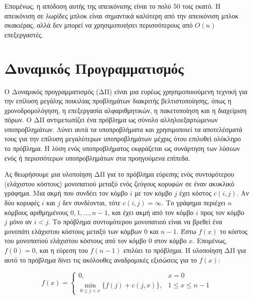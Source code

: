\documentclass[12pt,a4paper]{article}
\begin{document}
\noindent Επομένως, η απόδοση αυτής της απεικόνισης είναι το πολύ 50 τοις εκατό.
Η απεικόνιση σε λωρίδες μπλοκ είναι σημαντικά καλύτερη από την
απεικόνιση μπλοκ σκακιέρας, αλλά δεν μπορεί να χρησιμοποιήσει
περισσότερους από $O(n)$ επεξεργαστές.

\section{Δυναμικός Προγραμματισμός}
Ο Δυναμικός προγραμματισμός (ΔΠ) είναι μια ευρέως
χρησιμοποιούμενη τεχνική για την επίλυση μεγάλης ποικιλίας προβλημάτων
διακριτής βελτιστοποίησης, όπως η χρονοδρομολόγηση, η επεξεργασία
αλφαριθμητικών, η πακετοποίηση και η διαχείριση πόρων. Ο ΔΠ
αντιμετωπίζει ένα πρόβλημα ως σύνολο αλληλοεξαρτώμενων υποπροβλημάτων. 
Λύνει αυτά τα υποπροβλήματα και χρησιμοποιεί τα αποτελέσματά τους για την επίλυση μεγαλύτερων
υποπροβλημάτων μέχρις ότου επιλυθεί ολόκληρο το πρόβλημα. Η λύση
ενός υποπροβλήματος εκφράζεται ως συνάρτηση των λύσεων ενός ή
περισσότερων υποπροβλημάτων στα προηγούμενα επίπεδα.

Ας θεωρήσουμε μια υλοποίηση ΔΠ για το πρόβλημα εύρεσης ενός
συντομότερου (ελάχιστου κόστους) μονοπατιού μεταξύ ενός ζεύγους
κορυφών σε έναν ακυκλικό γράφημα. Μια ακμή που συνδέει τον κόμβο $i$
με τον κόμβο $j$ έχει κόστος $c(i, j)$. Αν δύο κορυφές $i$ και $j$
δεν συνδέονται, τότε $c(i, j) = \infty$. Το γράφημα περιέχει $n$
κόμβους αριθμημένους $0, 1, \ldots, n-1$, και έχει ακμή από τον κόμβο
$i$ προς τον κόμβο $j$ μόνο αν $i < j$. Το πρόβλημα συντομότερου
μονοπατιού είναι να βρεθεί ένα μονοπάτι ελάχιστου κόστους μεταξύ των
κόμβων 0 και $n-1$. Έστω $f(x)$ το κόστος του μονοπατιού ελάχιστου
κόστους από τον κόμβο 0 στον κόμβο $x$. Επομένως, $f(0) = 0$, και η
εύρεση του $f(n-1)$ επιλύει το πρόβλημα. Η υλοποίηση ΔΠ για αυτό το
πρόβλημα δίνει τις ακόλουθες αναδρομικές εξισώσεις για το $f(x)$:

\begin{equation}
f(x) =
\begin{cases}
0, & x = 0 \\
\displaystyle \min_{0 \le j < x} \{ f(j) + c(j,x) \}, & 1 \le x \le n-1
\end{cases}
\label{eq:relation12}
\end{equation}
\end{document}
